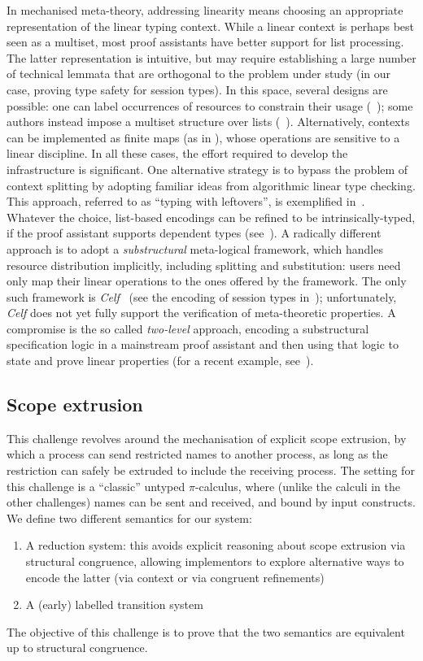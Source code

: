 \documentclass[runningheads]{llncs}
\begin{document}
In mechanised meta-theory, addressing linearity means choosing an appropriate
representation of the linear typing context.  While a linear context is perhaps
best seen as a multiset, most proof assistants have better support for list
processing.  The latter representation is intuitive, but may require
establishing a large number of technical lemmata that are orthogonal to the
problem under study (in our case, proving type safety for
session types).  In this space, several designs are possible: one can label
occurrences of resources to constrain their usage (\eg~\cite{CicconeP20}); some
authors instead impose a multiset structure over lists
(\eg~\cite{Danielsson12,ChaudhuriLR19}). Alternatively, contexts can be
implemented as finite maps (as in \cite{Castro2020}), whose operations are
sensitive to a linear discipline. In all these cases, the effort required to
develop the infrastructure is significant.
%
One alternative strategy is to bypass the problem of context splitting
by adopting familiar ideas from algorithmic linear type checking. This
approach, referred to as ``typing with leftovers'', is exemplified
in~\cite{DBLP:conf/forte/ZalakainD21}.  Whatever the choice,
list-based encodings can be refined to be intrinsically-typed, if the
proof assistant supports dependent types
(see~\cite{Thiemann2019,CicconeP20,RouvoetPKV20}).
%
A radically different approach is to adopt a \emph{substructural}
meta-logical framework, which handles resource
distribution implicitly, including splitting and
substitution: users need only map their linear operations to the
ones offered by the framework.  The only such framework is
\emph{Celf}~\cite{Schack-Nielsen:IJCAR08} (see the encoding of session
types in~\cite{Bock2016}); unfortunately, \emph{Celf} does not yet
fully support the verification of meta-theoretic properties.  A
compromise is the so called \emph{two-level} approach, \ie encoding a
substructural specification logic in a mainstream proof assistant and
then using that logic to state and prove linear properties (for a
recent example, see~\cite{Felty:MSCS21}).

\subsection{Scope extrusion}
This challenge revolves around the mechanisation of explicit scope
extrusion, by which a process can send restricted names to another
process, as long as the restriction can safely be extruded to include
the receiving process.  The setting for this challenge is a
``classic'' untyped \( \pi \)-calculus, where (unlike the calculi in
the other challenges) names can be sent and received, and bound by
input constructs.  We define two different semantics for our system:
\begin{enumerate}
\item A reduction system: this avoids explicit reasoning
about scope extrusion via structural congruence, allowing implementors to explore
alternative ways to encode the latter (\eg via context or via congruent refinements)
\item A (early) labelled transition system
\end{enumerate}
The objective of this
challenge is to prove that the two semantics are equivalent up to
structural congruence.
\end{document}
